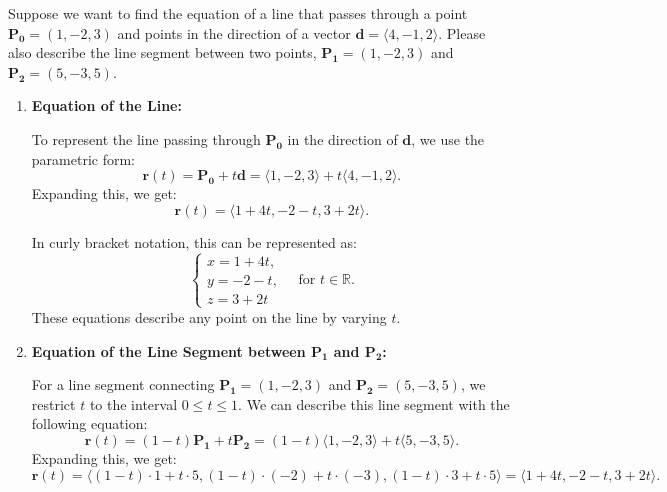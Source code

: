 \exampleline
\begin{example}
Suppose we want to find the equation of a line that passes through a point \( \mathbf{P_0} = (1, -2, 3) \) and points in the direction of a vector \( \mathbf{d} = \langle 4, -1, 2 \rangle \). Please also describe the line segment between two points, \( \mathbf{P_1} = (1, -2, 3) \) and \( \mathbf{P_2} = (5, -3, 5) \).

\begin{solution}

\begin{enumerate}
    \item \textbf{Equation of the Line:}
    
    \noindent To represent the line passing through \( \mathbf{P_0} \) in the direction of \( \mathbf{d} \), we use the parametric form:
    \[
    \mathbf{r}(t) = \mathbf{P_0} + t \mathbf{d} = \langle 1, -2, 3 \rangle + t \langle 4, -1, 2 \rangle.
    \]
    Expanding this, we get:
    \[
    \mathbf{r}(t) = \langle 1 + 4t, -2 - t, 3 + 2t \rangle.
    \]
    
    \noindent In curly bracket notation, this can be represented as:
    \[
    \left\{
    \begin{array}{l}
        x = 1 + 4t, \\
        y = -2 - t, \\
        z = 3 + 2t
    \end{array}
    \right. \quad \text{for } t \in \mathbb{R}.
    \]
    These equations describe any point on the line by varying \( t \).

    \item \textbf{Equation of the Line Segment between \( \mathbf{P_1} \) and \( \mathbf{P_2} \):}
    
    \noindent For a line segment connecting \( \mathbf{P_1} = (1, -2, 3) \) and \( \mathbf{P_2} = (5, -3, 5) \), we restrict \( t \) to the interval \( 0 \leq t \leq 1 \). We can describe this line segment with the following equation:
    \[
    \mathbf{r}(t) = (1 - t)\mathbf{P_1} + t \mathbf{P_2} = (1 - t)\langle 1, -2, 3 \rangle + t\langle 5, -3, 5 \rangle.
    \]
    Expanding this, we get:
    \[
    \mathbf{r}(t) = \langle (1 - t) \cdot 1 + t \cdot 5, (1 - t) \cdot (-2) + t \cdot (-3), (1 - t) \cdot 3 + t \cdot 5 \rangle = \langle 1 + 4t, -2 - t, 3 + 2t \rangle.
    \]
    

\end{enumerate}
\end{solution}
\end{example}
